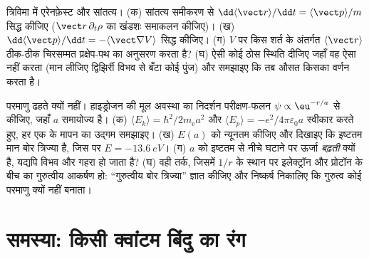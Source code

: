 \begin{exercise}[$\star\star\star$]\label{exo:b3:schrodinger-three-dimensions:11}
त्रिविमा में एरेनफ़ेस्ट और सांतत्य। (क) सांतत्य समीकरण से
$\dd\langle\vect r\rangle/\dd t = \langle\vect p\rangle/m$ सिद्ध
कीजिए ($\vect r\,\partial_t\rho$ का खंडशः समाकलन कीजिए)।
(ख) $\dd\langle\vect p\rangle/\dd t =
-\langle\vect\nabla V\rangle$ सिद्ध कीजिए। (ग) $V$ पर किस शर्त के
अंतर्गत $\langle\vect r\rangle$ ठीक-ठीक चिरसम्मत प्रक्षेप-पथ का
अनुसरण करता है? (घ) ऐसी कोई ठोस स्थिति दीजिए जहाँ वह ऐसा नहीं करता
(मान लीजिए द्विझिर्री विभव से बँटा कोई पुंज) और समझाइए कि तब औसत
किसका वर्णन करता है।
\end{exercise}

\begin{exercise}[$\star\star\star$]\label{exo:b3:schrodinger-three-dimensions:12}
परमाणु ढहते क्यों नहीं। हाइड्रोजन की मूल अवस्था का निदर्शन
परीक्षण-फलन $\psi \propto \eu^{-r/a}$ से कीजिए, जहाँ $a$ समायोज्य है।
(क) $\langle E_k\rangle = \hbar^2/2m_{\text{e}}a^2$ और
$\langle E_p\rangle = -e^2/4\pi\varepsilon_0a$ स्वीकार करते हुए,
हर एक के मापन का उद्गम समझाइए। (ख) $E(a)$ को न्यूनतम कीजिए और दिखाइए
कि इष्टतम मान बोर त्रिज्या है, जिस पर $E = \qty{-13.6}{eV}$। (ग)
$a$ को इष्टतम से नीचे घटाने पर ऊर्जा \emph{बढ़ती} क्यों है, यद्यपि
विभव और गहरा हो जाता है? (घ) वही तर्क, जिसमें $1/r$ के स्थान पर
इलेक्ट्रॉन और प्रोटॉन के बीच का गुरुत्वीय आकर्षण हो: ``गुरुत्वीय बोर
त्रिज्या'' ज्ञात कीजिए और निष्कर्ष निकालिए कि गुरुत्व कोई परमाणु
क्यों नहीं बनाता।
\end{exercise}

\section{समस्या: किसी क्वांटम बिंदु का रंग}

